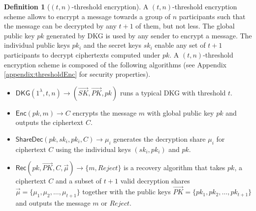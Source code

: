 \documentclass[letterpaper,twocolumn,10pt]{article}
\theoremstyle{definition}
\newtheorem{definition}[theorem]{Definition}
\theoremstyle{remark}
\begin{document}
\begin{definition}[$(t, n)$-threshold encryption] 
A $(t, n)$-threshold encryption scheme allows to encrypt a message towards a group of $n$ participants such that the message can be decrypted by any $t + 1$ of them, but not less. The global public key $pk$ generated by DKG is used by any sender to encrypt a message. The individual public keys $pk_i$ and the secret keys $sk_i$ enable any set of $t + 1$ participants to decrypt ciphertexts computed under $pk$. A $(t, n)$-threshold encryption scheme is composed of the following algorithms (see Appendix \ref{appendix:thresholdEnc} for security properties).
\begin{itemize}
    \item $\mathsf{DKG}(1^\lambda, t, n) \rightarrow (\vec{SK}, \vec{PK}, pk)$ runs a typical DKG with threshold $t$.
    \item $\mathsf{Enc}(pk, m) \rightarrow C$ encrypts the message $m$ with global public key $pk$ and outputs the ciphertext $C$.
    \item $\mathsf{ShareDec}(pk, sk_i, pk_i, C) \rightarrow \mu_i$ generates the decryption share $\mu_i$ for ciphertext $C$ using the individual keys $(sk_i, pk_i)$ and $pk$.
    \item $\mathsf{Rec}(pk, \vec{PK}, C, \vec{\mu} )\rightarrow \{m, Reject\}$ is a recovery algorithm that takes $pk$, a ciphertext $C$ and a subset of $t + 1$ valid decryption shares $\vec{\mu} = \{\mu_1, \mu_2,\ldots, \mu_{t + 1}\}$ together with the public keys $\vec{PK} = \{pk_1, pk_2,\ldots, pk_{t + 1}\}$ and outputs the message $m$ or $Reject$.
\end{itemize}
\end{definition}
\end{document}
